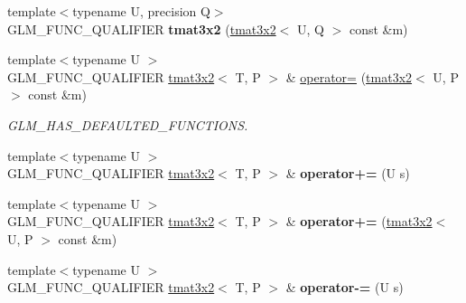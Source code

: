 \begin{DoxyCompactItemize}
\item 
\mbox{\label{structglm_1_1tmat3x2_ad33526a04ab8966123185267eb201755}} 
{\footnotesize template$<$typename U, precision Q$>$ }\\G\+L\+M\+\_\+\+F\+U\+N\+C\+\_\+\+Q\+U\+A\+L\+I\+F\+I\+ER {\bfseries tmat3x2} (\hyperlink{structglm_1_1tmat3x2}{tmat3x2}$<$ U, Q $>$ const \&m)
\item 
\mbox{\label{structglm_1_1tmat3x2_ac868522f7be6e78c28c6d00deb181060}} 
{\footnotesize template$<$typename U $>$ }\\G\+L\+M\+\_\+\+F\+U\+N\+C\+\_\+\+Q\+U\+A\+L\+I\+F\+I\+ER \hyperlink{structglm_1_1tmat3x2}{tmat3x2}$<$ T, P $>$ \& \hyperlink{structglm_1_1tmat3x2_ac868522f7be6e78c28c6d00deb181060}{operator=} (\hyperlink{structglm_1_1tmat3x2}{tmat3x2}$<$ U, P $>$ const \&m)
\begin{DoxyCompactList}\small\item\em G\+L\+M\+\_\+\+H\+A\+S\+\_\+\+D\+E\+F\+A\+U\+L\+T\+E\+D\+\_\+\+F\+U\+N\+C\+T\+I\+O\+NS. \end{DoxyCompactList}\item 
\mbox{\label{structglm_1_1tmat3x2_a36d12514d28052aae7538bba36709e81}} 
{\footnotesize template$<$typename U $>$ }\\G\+L\+M\+\_\+\+F\+U\+N\+C\+\_\+\+Q\+U\+A\+L\+I\+F\+I\+ER \hyperlink{structglm_1_1tmat3x2}{tmat3x2}$<$ T, P $>$ \& {\bfseries operator+=} (U s)
\item 
\mbox{\label{structglm_1_1tmat3x2_aab711028912b77b4658892c5a1a3a5a9}} 
{\footnotesize template$<$typename U $>$ }\\G\+L\+M\+\_\+\+F\+U\+N\+C\+\_\+\+Q\+U\+A\+L\+I\+F\+I\+ER \hyperlink{structglm_1_1tmat3x2}{tmat3x2}$<$ T, P $>$ \& {\bfseries operator+=} (\hyperlink{structglm_1_1tmat3x2}{tmat3x2}$<$ U, P $>$ const \&m)
\item 
\mbox{\label{structglm_1_1tmat3x2_a94092701c91edec5ab93035af7a3422b}} 
{\footnotesize template$<$typename U $>$ }\\G\+L\+M\+\_\+\+F\+U\+N\+C\+\_\+\+Q\+U\+A\+L\+I\+F\+I\+ER \hyperlink{structglm_1_1tmat3x2}{tmat3x2}$<$ T, P $>$ \& {\bfseries operator-\/=} (U s)
\item 
\mbox{\label{structglm_1_1tmat3x2_a192437e717b337e5dead355382eb0fa4}} 

\end{DoxyCompactItemize}
